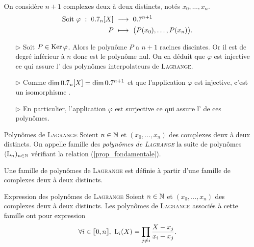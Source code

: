 \begin{preuve}
    On considère $n + 1$ complexes deux à deux distincts, notés $x_0, \dots, x_n$.
    \begin{alignat*}{2}
        \text{Soit } \varphi\ :\ \R_n[X]\ &\longrightarrow\ \R^{n+1}\\
        P\ &\longmapsto\ \big(P(x_0), \dots, P(x_n) \big).
    \end{alignat*}
    \begin{itemize}
        \item[$\rhd$] Soit $P \in \mathrm{Ker}\, \varphi$. Alors le polynôme $P$ a $n+1$ racines discintes. Or il est de degré inférieur à $n$ donc est le polynôme nul. On en déduit que $\varphi$ est injective ce qui assure l' des polynômes interpolateurs de \textsc{Lagrange}.
        \item[$\rhd$] Comme $\dim 0.7_n[X] = \dim 0.7^{n+1}$ et que l'application $\varphi$ est injective, c'est un isomorphisme \note.
        \item[$\rhd$] En particulier, l'application $\varphi$ est surjective ce qui assure l' de ces polynômes. 
    \end{itemize}
\end{preuve}

\begin{defi}{Polynômes de \textsc{Lagrange}}
    Soient $n \in \mathbb{N}$ et $(x_0, \dots, x_n)$ des complexes deux à deux distincts. On appelle famille des \emph{polynômes de \textsc{Lagrange}} la suite de polynômes $(\mathrm{L}_n)_{n \in \mathbb{N}}$ vérifiant la relation (\ref{prop_fondamentale}).
\end{defi}

\begin{remarque}
    Une famille de polynômes de \textsc{Lagrange} est définie à partir d'une famille de complexes deux à deux distincts. 
\end{remarque}

\begin{prop}{Expression des polynômes de \textsc{Lagrange}}
    Soient $n \in \mathbb{N}$ et $(x_0, \dots, x_n)$ des complexes deux à deux distincts. Les polynômes de \textsc{Lagrange} associés à cette famille ont pour expression
    $$\forall i \in \llbracket 0, n \rrbracket,\ \mathrm{L}_i(X) = \prod_{j \neq i} \frac{X-x_j}{x_i - x_j}.$$
\end{prop}

